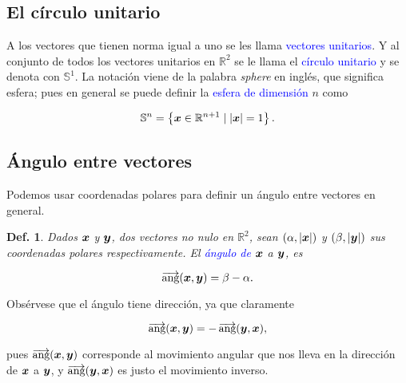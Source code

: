 \documentclass{article}
\theoremstyle{definicion}
\newtheorem{definicion}{Def.}
\theoremstyle{definition}             %
\theoremstyle{definition}             %
\theoremstyle{definition}
\theoremstyle{definition}
\theoremstyle{observacion}
\theoremstyle{definition}
\theoremstyle{plain}
\theoremstyle{definition}
\theoremstyle{afirmacion}
\theoremstyle{notation}
\theoremstyle{definition}
\DeclareMathOperator*{\ang}{\overrightarrow{\textrm{ang}}}
\begin{document}
        \subsection{El círculo unitario}

        A los vectores que tienen norma igual a uno se les llama \textcolor{blue}{vectores unitarios}. Y al conjunto de todos los vectores unitarios en \(\mathbb{R}^{2}\) se le llama el \textcolor{blue}{círculo unitario} y se denota con \(\mathbb{S}^{1}\). La notación viene de la palabra \emph{sphere} en inglés, que significa esfera; pues en general se puede definir la \textcolor{blue}{esfera de dimensión} \(n\) como

        \begin{equation*}
            \mathbb{S}^{n} = \left\lbrace \vb*{x} \in \mathbb{R}^{n + 1} \mid \abs{\vb*{x}} = 1 \right\rbrace.
        \end{equation*}

        \subsection{Ángulo entre vectores}

        Podemos usar coordenadas polares para definir un ángulo entre vectores en general.

        \begin{definicion}
            Dados \(\vb*{x}\) y \(\vb*{y}\), dos vectores no nulo en \(\mathbb{R}^{2}\), sean \((\alpha, \abs{\vb*{x}})\) y \((\beta, \abs{\vb*{y}})\) sus coordenadas polares respectivamente. El \textcolor{blue}{ángulo de} \(\vb*{x}\) a \(\vb*{y}\), es

            \begin{equation*}
                \ang(\vb*{x}, \vb*{y}) = \beta - \alpha.
            \end{equation*}
        \end{definicion}

        Obsérvese que el ángulo tiene dirección, ya que claramente

        \begin{equation*}
            \ang(\vb*{x}, \vb*{y}) = - \ang(\vb*{y}, \vb*{x}),
        \end{equation*}

        pues \(\ang(\vb*{x}, \vb*{y})\) corresponde al movimiento angular que nos lleva en la dirección de \(\vb*{x}\) a \(\vb*{y}\), y \(\ang(\vb*{y}, \vb*{x})\) es justo el movimiento inverso.
\end{document}
